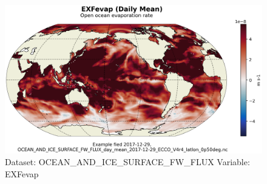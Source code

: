 \begin{figure}[H]
\centering
\includegraphics[scale=0.55]{../images/plots/latlon_plots/Ocean_and_Sea-Ice_Surface_Freshwater_Fluxes/EXFevap.png}
\caption{Dataset: OCEAN\_AND\_ICE\_SURFACE\_FW\_FLUX Variable: EXFevap}
\label{tab:table-OCEAN_AND_ICE_SURFACE_FW_FLUX_EXFevap-Plot}
\end{figure}
\pagebreak
